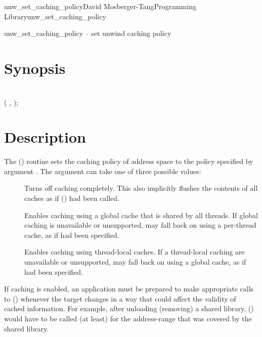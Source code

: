 \documentclass{article}
\begin{document}
\begin{Name}{3}{unw\_set\_caching\_policy}{David Mosberger-Tang}{Programming Library}{unw\_set\_caching\_policy}

  unw\_set\_caching\_policy -- set unwind caching policy
\end{Name}

\section{Synopsis}

\\

 ( ,  );\\

\section{Description}

The () routine sets the caching policy
of address space  to the policy specified by argument
.  The  argument can take one of three
possible values:
\begin{description}
\item[] Turns off caching completely.  This
  also implicitly flushes the contents of all caches as if
  () had been called.
\item[] Enables caching using a global cache
  that is shared by all threads.  If global caching is unavailable or
  unsupported,  may fall back on using a per-thread
  cache, as if  had been specified.
\item[] Enables caching using
  thread-local caches.  If a thread-local caching are unavailable or
  unsupported,  may fall back on using a global cache,
  as if  had been specified.
\end{description}

If caching is enabled, an application must be prepared to make
appropriate calls to () whenever the target
changes in a way that could affect the validity of cached information.
For example, after unloading (removing) a shared library,
() would have to be called (at least) for the
address-range that was covered by the shared library.
\end{document}
